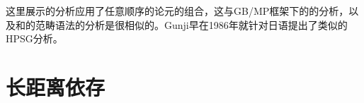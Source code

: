 
这里展示的分析应用了任意顺序的论元的组合，这与GB/MP框架下的\citet{Fanselow2001a}的分析，以及\citet[Section~3.1]{Hoffmann95a-u}和\citet{SB2006a-u}的范畴语法的分析是很相似的。Gunji\nocite{Gunji86a}早在1986年就针对日语提出了类似的HPSG分析。

\section{长距离依存}
\label{Abschnitt-Fernabhängigkeiten-HPSG}\label{sec-nld-HPSG}

